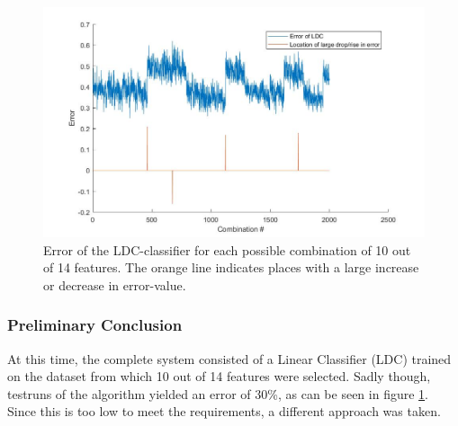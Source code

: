 \begin{figure}[H]
	\centering
	\includegraphics[scale=0.45]{images/feat_jumps.jpg}
	\caption{Error of the LDC-classifier for each possible combination of 10 out of 14 features. The orange line indicates places with a large increase or decrease in error-value.}
	\label{fig:feat_jumps}
\end{figure}

\subsubsection*{Preliminary Conclusion}
\noindent At this time, the complete system consisted of a Linear Classifier (LDC) trained on the dataset from which 10 out of 14 features were selected. Sadly though, testruns of the algorithm yielded an error of 30\%, as can be seen in figure \ref{fig:feat_jumps}. Since this is too low to meet the requirements, a different approach was taken. \\

